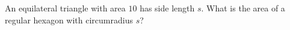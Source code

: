 An equilateral triangle with area $10$ has side length $s$. What is the area of a regular hexagon with circumradius $s$?
